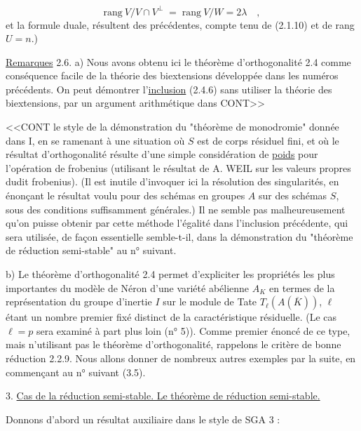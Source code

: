 \begin{equation}\tag{2.5.5}
\mathrm{rang}\ V/V \cap V^{\perp} \;=\; \mathrm{rang}\ V/W = 2\lambda \quad ,
\end{equation}
et la formule duale, résultent des précédentes, compte tenu de (2.1.10) et de rang $U = n$.)

\underline{Remarques} 2.6.  a) Nous avons obtenu ici le théorème d'orthogonalité 2.4 comme conséquence facile de la théorie des biextensions développée dans les numéros précédents. On peut démontrer l'\underline{inclusion} (2.4.6) sans utiliser la théorie des biextensions, par un argument arithmétique dans CONT>>



<<CONT le style de la démonstration du "théorème de monodromie" donnée dans I, en se ramenant à une situation où $S$ est de corps résiduel fini, et où le résultat d'orthogonalité résulte d'une simple considération de \underline{poids} pour l'opération de frobenius (utilisant le résultat de A. WEIL sur les valeurs propres dudit frobenius). (Il est inutile d'invoquer ici la résolution des singularités, en énonçant le résultat voulu pour des schémas en groupes $A$ sur des schémas $S$, sous des conditions suffisamment générales.) Il ne semble pas malheureusement qu'on puisse obtenir par cette méthode l'égalité dans l'inclusion précédente, qui sera utilisée, de façon essentielle semble-t-il, dans la démonstration du "théorème de réduction semi-stable" au n° suivant.

b) Le théorème d'orthogonalité 2.4 permet d'expliciter les propriétés les plus importantes du modèle de Néron d'une variété abélienne $A_{K}$ en termes de la représentation du groupe d'inertie $I$ sur le module de Tate $T_{\ell}(A(\overline{K}))$, $\ell$ étant un nombre premier fixé distinct de la caractéristique résiduelle. (Le cas $\ell = p$ sera examiné à part plus loin (n° 5)). Comme premier énoncé de ce type, mais n'utilisant pas le théorème d'orthogonalité, rappelons le critère de bonne réduction 2.2.9. Nous allons donner de nombreux autres exemples par la suite, en commençant au n° suivant (3.5).




3. \underline{Cas de la réduction semi-stable. Le théorème de réduction semi-stable.}

Donnons d'abord un résultat auxiliaire dans le style de SGA 3 :

